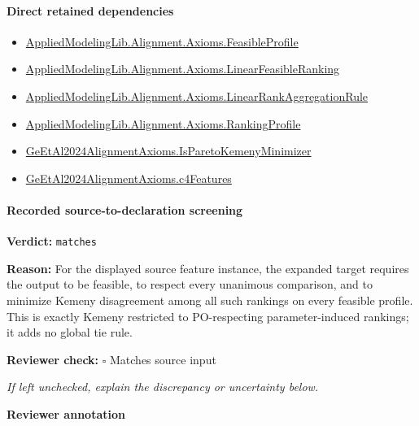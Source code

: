 \documentclass[10pt]{article}
\newcommand{\reviewerbox}{%
  \par\noindent\fbox{\parbox{0.96\linewidth}{\rule{0pt}{0.38in}}}\par
}
\newcommand{\reviewmatch}[1]{%
  \par\noindent\textbf{Reviewer check:} $\square$\; #1\par
  \noindent\emph{If left unchecked, explain the discrepancy or uncertainty below.}\par
}
\begin{document}
\paragraph{Direct retained dependencies}
\begin{itemize}\raggedright
\item \hyperlink{library-prerequisite-5fa7bdb49b050adf}{Applied\allowbreak{}Modeling\allowbreak{}Lib.\allowbreak{}Alignment.\allowbreak{}Axioms.\allowbreak{}Feasible\allowbreak{}Profile}
\item \hyperlink{library-prerequisite-3c30aae25bef2671}{Applied\allowbreak{}Modeling\allowbreak{}Lib.\allowbreak{}Alignment.\allowbreak{}Axioms.\allowbreak{}Linear\allowbreak{}Feasible\allowbreak{}Ranking}
\item \hyperlink{library-prerequisite-43447e121a1884f9}{Applied\allowbreak{}Modeling\allowbreak{}Lib.\allowbreak{}Alignment.\allowbreak{}Axioms.\allowbreak{}Linear\allowbreak{}Rank\allowbreak{}Aggregation\allowbreak{}Rule}
\item \hyperlink{library-prerequisite-9bded048a60dfe0a}{Applied\allowbreak{}Modeling\allowbreak{}Lib.\allowbreak{}Alignment.\allowbreak{}Axioms.\allowbreak{}Ranking\allowbreak{}Profile}
\item \hyperlink{governing-declaration-3ef0413c019a9550}{Ge\allowbreak{}Et\allowbreak{}Al2024\allowbreak{}Alignment\allowbreak{}Axioms.\allowbreak{}Is\allowbreak{}Pareto\allowbreak{}Kemeny\allowbreak{}Minimizer}
\item \hyperlink{governing-declaration-2f0a2cc3cce8bb61}{Ge\allowbreak{}Et\allowbreak{}Al2024\allowbreak{}Alignment\allowbreak{}Axioms.\allowbreak{}c4\allowbreak{}Features}
\end{itemize}
\paragraph{Recorded source-to-declaration screening}
\textbf{Verdict:} \texttt{matches}
\\
{\raggedright
\textbf{Reason:} For the displayed source feature instance, the expanded target requires the output to be feasible, to respect every unanimous comparison, and to minimize Kemeny disagreement among all such rankings on every feasible profile.\allowbreak{} This is exactly Kemeny restricted to PO-\allowbreak{}respecting parameter-\allowbreak{}induced rankings;\allowbreak{} it adds no global tie rule.\allowbreak{}
\par}
\reviewmatch{Matches source input}
\noindent\textbf{Reviewer annotation}\par
\reviewerbox
\clearpage
\hypertarget{paper-prerequisite-f75cae04980bec13}{}
\end{document}
